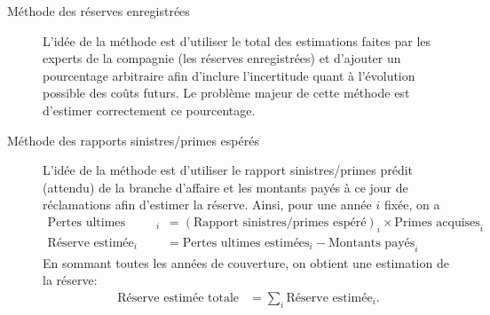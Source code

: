 \begin{description}
\item[Méthode des réserves enregistrées] L'idée de la méthode est
  d'utiliser le total des estimations faites par les experts de la
  compagnie (les réserves enregistrées) et d'ajouter un pourcentage
  arbitraire afin d'inclure l'incertitude quant à l'évolution possible
  des coûts futurs. Le problème majeur de cette méthode est d'estimer
  correctement ce pourcentage.

\item[Méthode des rapports sinistres/primes espérés] L'idée de la
  méthode est d'utiliser le rapport sinistres/primes prédit (attendu)
  de la branche d'affaire et les montants payés à ce jour de
  réclamations afin d'estimer la réserve. Ainsi, pour une année $i$
  fixée, on a
  \begin{align*}
    \text{Pertes ultimes estimées}_i
    &= \left(\text{Rapport sinistres/primes espéré}\right)_i \times \text{Primes acquises}_i\\
    \text{Réserve estimée}_i
    &= \text{Pertes ultimes estimées}_i - \text{Montants payés}_i
  \end{align*}
  En sommant toutes les années de couverture, on obtient une
  estimation de la réserve:
  \begin{align*}
    \text{Réserve estimée totale} &= \sum_i \text{Réserve estimée}_i.
  \end{align*}
\end{description}

